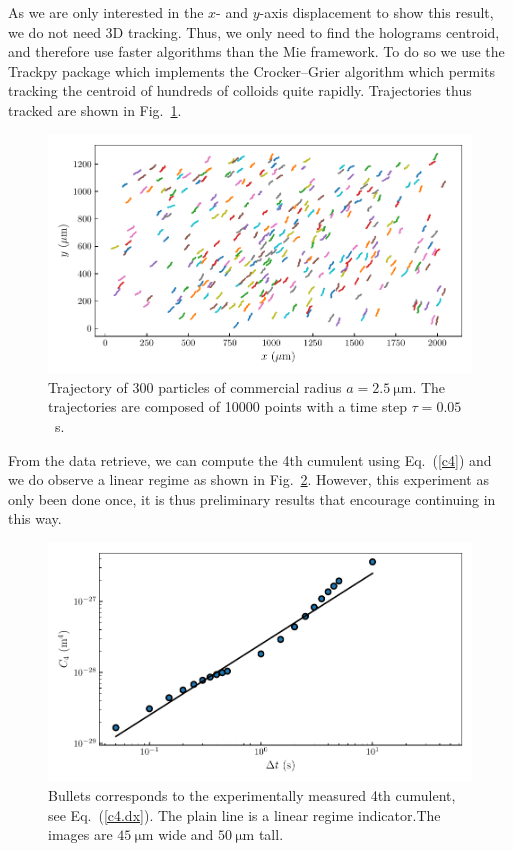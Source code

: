 As we are only interested in the $x$- and $y$-axis displacement to show this result, we do not need 3D tracking. Thus, we only need to find the holograms centroid, and therefore use faster algorithms than the Mie framework. To do so we use the Trackpy package \href{https://github.com/soft-matter/trackpy}{\faGithub} \cite{allan_soft-mattertrackpy_2021} which implements the Crocker–Grier algorithm \cite{crocker_methods_1996} which permits tracking the centroid of hundreds of colloids quite rapidly. Trajectories thus tracked are shown in Fig.~\ref{fig.trajtrackpy}.
\begin{figure}[H]
	\centering
	\includegraphics{02_body/chapter4/images/4th_cumulent/trajectories.pdf}
	\caption{Trajectory of 300 particles of commercial radius $a=2.5 ~ \mathrm{\mu m}$. The trajectories are composed of 10000 points with a time step $\tau = 0.05$~s. }
	\label{fig.trajtrackpy}
\end{figure}
From the data retrieve, we can compute the 4th cumulent using Eq.~(\ref{c4}) and we do observe a linear regime as shown in Fig.~\ref{fig.forth}. However, this experiment as only been done once, it is thus preliminary results that encourage continuing in this way.
\begin{figure}[H]
	\centering
	\includegraphics{02_body/chapter4/images/4th_cumulent/fourth.pdf}
	\caption{Bullets corresponds to the experimentally measured 4th cumulent, see Eq.~(\ref{c4.dx}). The plain line is a linear regime indicator.The images are $45~\mathrm{\mu m}$ wide and $50~\mathrm{\mu m}$ tall.}
	\label{fig.forth}
\end{figure}
